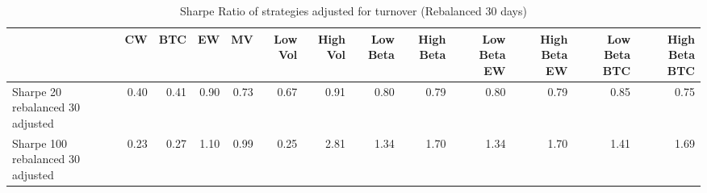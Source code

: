 \begin{table}
\centering
\caption{Sharpe Ratio of strategies adjusted for turnover (Rebalanced 30 days)}
\label{sharpe30}
\begin{tabular}{lrrrrrrrrrrrr}
\toprule
{} &   CW &  BTC &   EW &   MV &  Low Vol &  High Vol &  Low Beta &  High Beta &  Low Beta EW &  High Beta EW &  Low Beta BTC &  High Beta BTC \\
\midrule
Sharpe 20 rebalanced 30 adjusted  & 0.40 & 0.41 & 0.90 & 0.73 &     0.67 &      0.91 &      0.80 &       0.79 &         0.80 &          0.79 &          0.85 &           0.75 \\
Sharpe 100 rebalanced 30 adjusted & 0.23 & 0.27 & 1.10 & 0.99 &     0.25 &      2.81 &      1.34 &       1.70 &         1.34 &          1.70 &          1.41 &           1.69 \\
\bottomrule
\end{tabular}
\end{table}
